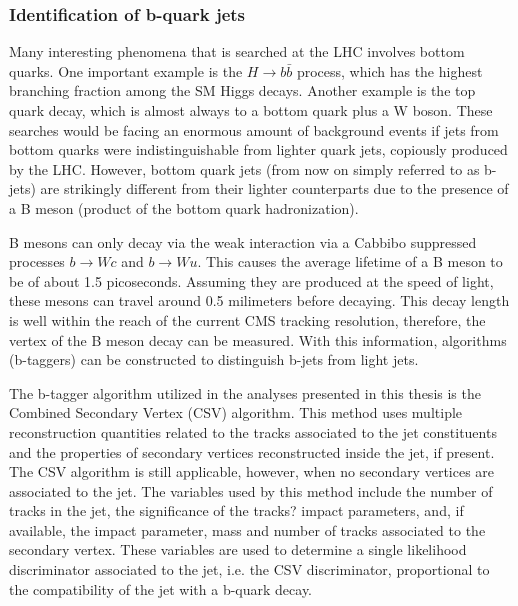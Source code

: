 \subsubsection{Identification of b-quark jets}

Many interesting phenomena that is searched at the LHC involves bottom quarks. 
One important example is the $H\rightarrow b\bar{b}$ process, which has the highest branching fraction among the SM Higgs decays. 
Another example is the top quark decay, which is almost always to a bottom quark plus a W boson. 
These searches would be facing an enormous amount of background events if jets from bottom quarks were indistinguishable from lighter quark jets, copiously produced by the LHC. 
However, bottom quark jets (from now on simply referred to as b-jets) are strikingly different from their lighter counterparts due to the presence of a B meson (product of the bottom quark hadronization). 

B mesons can only decay via the weak interaction via a Cabbibo suppressed processes $b\rightarrow Wc$ and $b\rightarrow Wu$. 
This causes the average lifetime of a B meson to be of about 1.5 picoseconds. 
Assuming they are produced at the speed of light, these mesons can travel around 0.5 milimeters before decaying. 
This decay length is well within the reach of the current CMS tracking resolution, therefore, the vertex of the B meson decay can be measured. 
With this information, algorithms (b-taggers) can be constructed to distinguish b-jets from light jets.

The b-tagger algorithm utilized in the analyses presented in this thesis is the Combined Secondary Vertex (CSV) algorithm. 
This method uses multiple reconstruction quantities related to the tracks associated to the jet constituents and the properties of secondary vertices reconstructed inside the jet, if present. 
The CSV algorithm is still applicable, however, when no secondary vertices are associated to the jet. 
The variables used by this method include the number of tracks in the jet, the significance of the tracks? impact parameters, and, if available, the impact parameter, mass and number of tracks associated to the secondary vertex. 
These variables are used to determine a single likelihood discriminator associated to the jet, i.e. the CSV discriminator, proportional to the compatibility of the jet with a b-quark decay.













